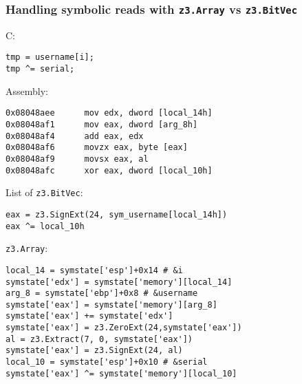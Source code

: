 \documentclass[aspectratio=169]{beamer}
\begin{document}
\begin{frame}[fragile]
\frametitle{Handling symbolic reads with \texttt{z3.Array} vs \texttt{z3.BitVec}}
\begin{minipage}{0.46\textwidth}
C:
\begin{Verbatim}[fontsize=\scriptsize, frame=single]
tmp = username[i];
tmp ^= serial;
\end{Verbatim}
Assembly:
\begin{Verbatim}[fontsize=\scriptsize, frame=single]
0x08048aee      mov edx, dword [local_14h]
0x08048af1      mov eax, dword [arg_8h]
0x08048af4      add eax, edx
0x08048af6      movzx eax, byte [eax]
0x08048af9      movsx eax, al
0x08048afc      xor eax, dword [local_10h]
\end{Verbatim}
\end{minipage}
\begin{minipage}{0.53\textwidth}
List of \verb|z3.BitVec|:
\begin{Verbatim}[fontsize=\scriptsize, frame=single]
eax = z3.SignExt(24, sym_username[local_14h])
eax ^= local_10h
\end{Verbatim}
\verb|z3.Array|:
\begin{Verbatim}[fontsize=\scriptsize, frame=single]
local_14 = symstate['esp']+0x14 # &i
symstate['edx'] = symstate['memory'][local_14]
arg_8 = symstate['ebp']+0x8 # &username
symstate['eax'] = symstate['memory'][arg_8]
symstate['eax'] += symstate['edx']
symstate['eax'] = z3.ZeroExt(24,symstate['eax'])
al = z3.Extract(7, 0, symstate['eax'])
symstate['eax'] = z3.SignExt(24, al)
local_10 = symstate['esp']+0x10 # &serial
symstate['eax'] ^= symstate['memory'][local_10]
\end{Verbatim}
\end{minipage}
\end{frame}

\end{document}
